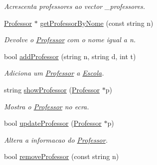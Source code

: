 \begin{DoxyCompactItemize}
\begin{DoxyCompactList}\small\item\em Acrescenta professores ao vector \-\_\-professores. \end{DoxyCompactList}\item 
\hypertarget{class_escola_a1f0dba75b82a3aec3cdaccafec4350c3}{\hyperlink{class_professor}{Professor} $\ast$ \hyperlink{class_escola_a1f0dba75b82a3aec3cdaccafec4350c3}{get\-Professor\-By\-Nome} (const string n)}\label{class_escola_a1f0dba75b82a3aec3cdaccafec4350c3}

\begin{DoxyCompactList}\small\item\em Devolve o \hyperlink{class_professor}{Professor} com o nome igual a n. \end{DoxyCompactList}\item 
\hypertarget{class_escola_a9cb288aece2339850bd18eaf1614f8b9}{bool \hyperlink{class_escola_a9cb288aece2339850bd18eaf1614f8b9}{add\-Professor} (string n, string d, int t)}\label{class_escola_a9cb288aece2339850bd18eaf1614f8b9}

\begin{DoxyCompactList}\small\item\em Adiciona um \hyperlink{class_professor}{Professor} a \hyperlink{class_escola}{Escola}. \end{DoxyCompactList}\item 
\hypertarget{class_escola_addc6cd7b85c6fdba76dd536c580c16c8}{string \hyperlink{class_escola_addc6cd7b85c6fdba76dd536c580c16c8}{show\-Professor} (\hyperlink{class_professor}{Professor} $\ast$p)}\label{class_escola_addc6cd7b85c6fdba76dd536c580c16c8}

\begin{DoxyCompactList}\small\item\em Mostra o \hyperlink{class_professor}{Professor} no ecra. \end{DoxyCompactList}\item 
\hypertarget{class_escola_a409612d09d981eb7e6e3a532080d7aed}{bool \hyperlink{class_escola_a409612d09d981eb7e6e3a532080d7aed}{update\-Professor} (\hyperlink{class_professor}{Professor} $\ast$p)}\label{class_escola_a409612d09d981eb7e6e3a532080d7aed}

\begin{DoxyCompactList}\small\item\em Altera a informacao do \hyperlink{class_professor}{Professor}. \end{DoxyCompactList}\item 
\hypertarget{class_escola_ab88ff73f646f14380fdbb5a55bc49882}{bool \hyperlink{class_escola_ab88ff73f646f14380fdbb5a55bc49882}{remove\-Professor} (const string n)}\label{class_escola_ab88ff73f646f14380fdbb5a55bc49882}


\end{DoxyCompactItemize}
